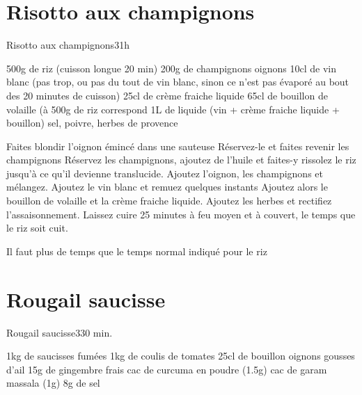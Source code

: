 {\section{Risotto aux champignons}
\begin{recette}{Risotto aux champignons}{3}{1h}{}
\begin{ingredients}
\ingredient 500g de riz (cuisson longue 20 min)
\ingredient 200g de champignons
 oignons
\ingredient 10cl de vin blanc (pas trop, ou pas du tout de vin blanc, sinon ce n'est pas évaporé au bout des 20 minutes de 
cuisson)
\ingredient 25cl de crème fraiche liquide
\ingredient 65cl de bouillon de volaille (à 500g de riz correspond 1L de liquide (vin + crème fraiche liquide + bouillon)
\ingredient sel, poivre, herbes de provence
\end{ingredients}

\begin{preparation}
\etape Faites blondir l'oignon émincé dans une sauteuse
\etape Réservez-le et faites revenir les champignons
\etape Réservez les champignons, ajoutez de l'huile et faites-y rissolez le riz jusqu'à ce qu'il devienne translucide.
\etape Ajoutez l'oignon, les champignons et mélangez.
\etape Ajoutez le vin blanc et remuez quelques instants 
\etape Ajoutez alors le bouillon de volaille et la crème fraiche liquide. 
\etape Ajoutez les herbes et rectifiez l'assaisonnement.
\etape Laissez cuire 25 minutes à feu moyen et à couvert, le temps que le riz soit cuit. 
\begin{remarque}
Il faut plus de temps que le temps normal indiqué pour le riz
\end{remarque}
\end{preparation}
\end{recette}


\section{Rougail saucisse}
\begin{recette}{Rougail saucisse}{3}{30 min.}{}
\begin{ingredients}
\ingredient 1kg de saucisses fumées
\ingredient 1kg de coulis de tomates
\ingredient 25cl de bouillon
 oignons
 gousses d'ail
\ingredient 15g de gingembre frais %
 cac de curcuma en poudre (1.5g)
 cac de garam massala (1g)
\ingredient 8g de sel
\end{ingredients}



\end{recette}}

